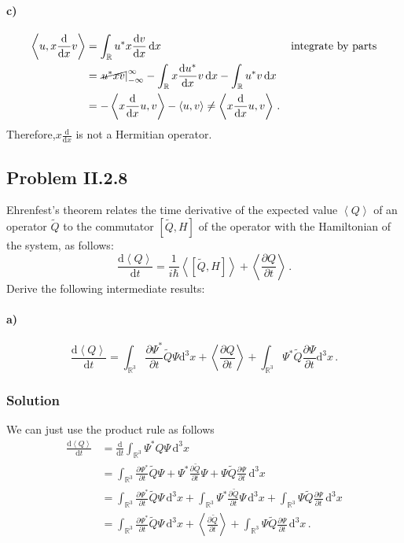 \documentclass[letterpaper,10pt]{article}
\def\expect#1{\left\langle #1\right\rangle}
\def\d{\mathrm{d}}
\def\mbb{\mathbb}
\begin{document}
\paragraph*{c)}
\begin{align*}
\expect{u,x\frac{\d}{\d x}v}&=\int_\mbb{R}u^*x\frac{\d v}{\d x}\,\d x &
\text{integrate by parts}\\
&=\left.\cancel{u^*xv}\right|_{-\infty}^\infty
-\int_\mbb{R}x\frac{\d u^*}{\d x}v\,\d x
-\int_\mbb{R}u^*v\,\d x\\
&=-\expect{x\frac{\d}{\d x}u,v}-\expect{u,v}
\neq\expect{x\frac{\d}{\d x}u,v}\,.
\end{align*}
Therefore,$x\frac{\d}{\d x}$ is not a Hermitian operator.

\subsection*{Problem II.2.8}
Ehrenfest's theorem relates the time derivative of the expected value
$\expect{Q}$ of an operator $\tilde Q$ to the commutator $[\tilde Q,H]$ of the
operator with the Hamiltonian of the system, as follows:
\[
\frac{\d\expect{Q}}{\d t}=
\frac{1}{i\hbar}\expect{[\tilde Q,H]}+\expect{\frac{\partial Q}{\partial t}}\,.
\]
Derive the following intermediate results:

\paragraph*{a)}
\[
\frac{\d\expect{Q}}{\d t}=\int_{\mbb{R}^3}\frac{\partial\Psi^*}{\partial t}
\tilde Q\Psi\d^3 x+\expect{\frac{\partial Q}{\partial t}}
+\int_{\mbb{R}^3}\Psi^*\tilde Q\frac{\partial \Psi}{\partial t}\d^3 x\,.
\]
\subsubsection*{Solution}
We can just use the product rule as follows
\begin{align*}
\frac{\d\expect{Q}}{\d t}&=\frac{\d}{\d t}\int_{\mbb{R}^3}\Psi^*Q\Psi\,\d^3 x\\
&=\int_{\mbb{R}^3}\frac{\partial\Psi^*}{\partial t}\tilde Q\Psi
+\Psi^*\frac{\partial\tilde Q}{\partial t}\Psi
+\Psi\tilde Q\frac{\partial\Psi}{\partial t}\,\d^3x\\
&=\int_{\mbb{R}^3}\frac{\partial\Psi^*}{\partial t}\tilde Q\Psi\,\d^3x
+\int_{\mbb{R}^3}\Psi^*\frac{\partial\tilde Q}{\partial t}\Psi\,\d^3x
+\int_{\mbb{R}^3}\Psi\tilde Q\frac{\partial\Psi}{\partial t}\,\d^3x\\
&=\int_{\mbb{R}^3}\frac{\partial\Psi^*}{\partial t}\tilde Q\Psi\,\d^3x
+\expect{\frac{\partial\tilde Q}{\partial t}}
+\int_{\mbb{R}^3}\Psi\tilde Q\frac{\partial\Psi}{\partial t}\,\d^3x\,.
\end{align*}
\end{document}
